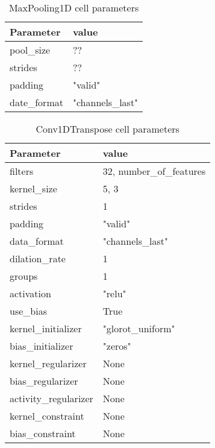 \begin{table}[h]
  \centering
  \caption{MaxPooling1D cell parameters}
  \label{table:MaxPooling1D-cell-parameters}
  \begin{tabular}{|l|l|}\hline
    Parameter    & value            \\ \hline
    \hline
    pool\_size   & ??               \\ \hline
    strides      & ??               \\ \hline
    padding      & "valid"          \\ \hline
    date\_format & "channels\_last" \\ \hline
    \hline
  \end{tabular}
\end{table}
\begin{table}[h]
  \centering
  \caption{Conv1DTranspose cell parameters}
  \label{table:conv1dtranspose-cell-parameters}
  \begin{tabular}{|l|l|}\hline
    Parameter             & value                    \\ \hline
    \hline
    filters               & 32, number\_of\_features \\ \hline
    kernel\_size          & 5, 3                     \\ \hline
    strides               & 1                        \\ \hline
    padding               & "valid"                  \\ \hline
    data\_format          & "channels\_last"         \\ \hline
    dilation\_rate        & 1                        \\ \hline
    groups                & 1                        \\ \hline
    activation            & "relu"                   \\ \hline
    use\_bias             & True                     \\ \hline
    kernel\_initializer   & "glorot\_uniform"        \\ \hline
    bias\_initializer     & "zeros"                  \\ \hline
    kernel\_regularizer   & None                     \\ \hline
    bias\_regularizer     & None                     \\ \hline
    activity\_regularizer & None                     \\ \hline
    kernel\_constraint    & None                     \\ \hline
    bias\_constraint      & None                     \\ \hline
    \hline
  \end{tabular}
\end{table}



